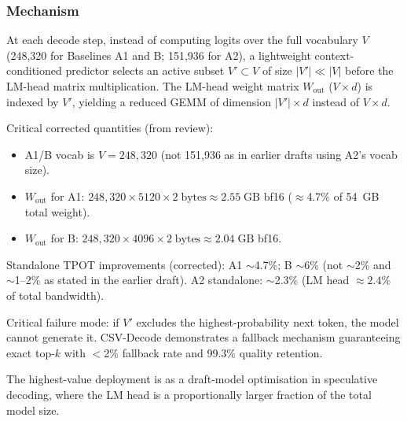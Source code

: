 \documentclass[11pt]{article}
\begin{document}
\subsubsection*{Mechanism}
At each decode step, instead of computing logits over the full vocabulary $V$ (248,320 for Baselines A1 and B; 151,936 for A2), a lightweight context-conditioned predictor selects an active subset $V' \subset V$ of size $|V'| \ll |V|$ before the LM-head matrix multiplication.
The LM-head weight matrix $W_\text{out}$ ($V \times d$) is indexed by $V'$, yielding a reduced GEMM of dimension $|V'| \times d$ instead of $V \times d$.

Critical corrected quantities (from review):
\begin{itemize}
  \item A1/B vocab is $V=248{,}320$ (not 151,936 as in earlier drafts using A2's vocab size).
  \item $W_\text{out}$ for A1: $248{,}320 \times 5120 \times 2\;\text{bytes} \approx 2.55\;\text{GB}$ bf16 ($\approx$4.7\% of 54~GB total weight).
  \item $W_\text{out}$ for B: $248{,}320 \times 4096 \times 2\;\text{bytes} \approx 2.04\;\text{GB}$ bf16.
\end{itemize}

Standalone TPOT improvements (corrected): A1 $\sim$4.7\%; B $\sim$6\% (not $\sim$2\% and $\sim$1--2\% as stated in the earlier draft).
A2 standalone: $\sim$2.3\% (LM head $\approx 2.4\%$ of total bandwidth).

Critical failure mode: if $V'$ excludes the highest-probability next token, the model cannot generate it.
CSV-Decode \cite{HeEtAl2024} demonstrates a fallback mechanism guaranteeing exact top-$k$ with $<$2\% fallback rate and 99.3\% quality retention.

The highest-value deployment is as a draft-model optimisation in speculative decoding, where the LM head is a proportionally larger fraction of the total model size.
\end{document}
